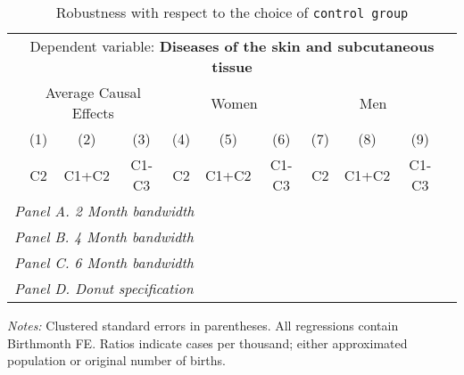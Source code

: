  \begin{table}[H] \begin{threeparttable} \centering \caption{Robustness with respect to the choice of \texttt{control group}} {\def\sym#1{\ifmmode^{#1}\else\(^{#1}\)\fi} \begin{tabular}{l*{10}{c}} \toprule & \multicolumn{9}{c}{Dependent variable: \textbf{Diseases of the skin and subcutaneous tissue}} \\ \cmidrule(lr){2-10}
            &\multicolumn{3}{c}{Average Causal Effects}&\multicolumn{3}{c}{Women}             &\multicolumn{3}{c}{Men}               \\\cmidrule(lr){2-4}\cmidrule(lr){5-7}\cmidrule(lr){8-10}
            &\multicolumn{1}{c}{(1)}&\multicolumn{1}{c}{(2)}&\multicolumn{1}{c}{(3)}&\multicolumn{1}{c}{(4)}&\multicolumn{1}{c}{(5)}&\multicolumn{1}{c}{(6)}&\multicolumn{1}{c}{(7)}&\multicolumn{1}{c}{(8)}&\multicolumn{1}{c}{(9)}\\
            &\multicolumn{1}{c}{C2}&\multicolumn{1}{c}{C1+C2}&\multicolumn{1}{c}{C1-C3}&\multicolumn{1}{c}{C2}&\multicolumn{1}{c}{C1+C2}&\multicolumn{1}{c}{C1-C3}&\multicolumn{1}{c}{C2}&\multicolumn{1}{c}{C1+C2}&\multicolumn{1}{c}{C1-C3}\\
\midrule
 \multicolumn{10}{l}{\emph{Panel A. 2 Month bandwidth}} \\    \midrule\multicolumn{10}{l}{\emph{Panel B. 4 Month bandwidth}} \\    \midrule\multicolumn{10}{l}{\emph{Panel C. 6 Month bandwidth}} \\    \midrule\multicolumn{10}{l}{\emph{Panel D. Donut specification}} \\    
\bottomrule \end{tabular} } \begin{tablenotes} \item \scriptsize \emph{Notes:} Clustered standard errors in parentheses. All regressions contain Birthmonth FE. Ratios indicate cases per thousand; either approximated population or original number of births. \end{tablenotes} \end{threeparttable} \end{table} 

